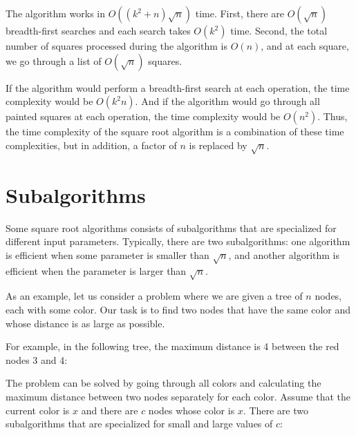 The algorithm works in
$O((k^2+n) \sqrt n)$ time.
First, there are $O(\sqrt n)$ breadth-first searches
and each search takes $O(k^2)$ time.
Second, the total number of
squares processed during the algorithm
is $O(n)$, and at each square,
we go through a list of $O(\sqrt n)$ squares.

If the algorithm would perform a breadth-first search
at each operation, the time complexity would be
$O(k^2 n)$.
And if the algorithm would go through all painted
squares at each operation,
the time complexity would be $O(n^2)$.
Thus, the time complexity of the square root algorithm
is a combination of these time complexities,
but in addition, a factor of $n$ is replaced by $\sqrt n$.

\section{Subalgorithms}

Some square root algorithms consists of
subalgorithms that are specialized for different
input parameters.
Typically, there are two subalgorithms:
one algorithm is efficient when
some parameter is smaller than $\sqrt n$,
and another algorithm is efficient
when the parameter is larger than $\sqrt n$.

As an example, let us consider a problem where
we are given a tree of $n$ nodes,
each with some color. Our task is to find two nodes
that have the same color and whose distance
is as large as possible.

For example, in the following tree,
the maximum distance is 4 between
the red nodes 3 and 4:

\begin{center}
\end{center}

The problem can be solved by going through
all colors and calculating
the maximum distance between two nodes
separately for each color.
Assume that the current color is $x$ and
there are $c$ nodes whose color is $x$.
There are two subalgorithms
that are specialized for small and large
values of $c$:

